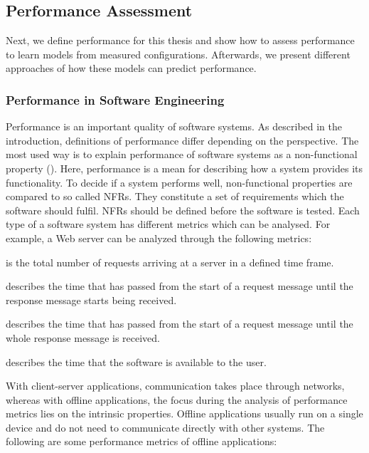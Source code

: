 \subsection{Performance Assessment}
\label{background_perf}

Next, we define performance for this thesis and show how to assess performance to learn models from measured configurations. 
Afterwards, we present different approaches of how these models can predict performance.

\subsubsection{Performance in Software Engineering}
\label{perf_general}

Performance is an important quality of software systems. 
As described in the introduction, definitions of performance differ depending on the perspective. 
The most used way is to explain performance of software systems as a non-functional property (\cite{Molyneaux:2009:AAP:1550832,liggesmeyer2002software}). 
Here, performance is a mean for describing how a system provides its functionality. 
To decide if a system performs well, non-functional properties are compared to so called \acp{NFR}. 
They constitute a set of requirements which the software should fulfil. 
\acp{NFR} should be defined before the software is tested. 
Each type of a software system has different metrics which can be analysed. 
For example, a Web server can be analyzed through the following metrics:

\begin{description}[style=multiline,leftmargin=10em]
	\item [Hit Rate] is the total number of requests arriving at a server in a defined time frame.
	\item [Latency] describes the time that has passed from the start of a request message until the response message starts being received.
	\item [Response Time] describes the time that has passed from the start of a request message until the whole response message is received.
	\item [Availability] describes the time that the software is available to the user.
\end{description}

With client-server applications, communication takes place through networks, whereas with offline applications, the focus during the analysis of performance metrics lies on the intrinsic properties.
Offline applications usually run on a single device and do not need to communicate directly with other systems. 
The following are some performance metrics of offline applications:

